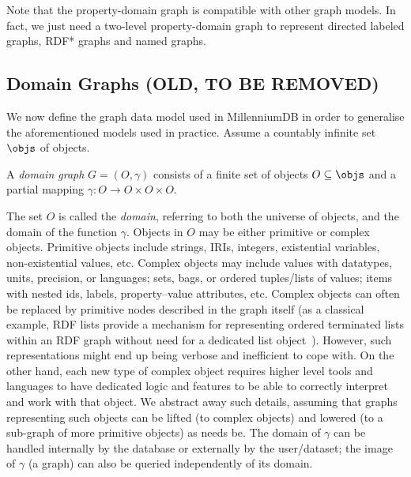 Note that the property-domain graph is compatible with other graph models.
In fact, we just need a two-level property-domain graph to represent directed labeled graphs, RDF* graphs and named graphs.








\subsection{Domain Graphs (OLD, TO BE REMOVED)}
\label{sec-proposal}

We now define the graph data model used in MillenniumDB in order to generalise the aforementioned models used in practice. Assume a countably infinite set $\objs$ of objects.

\begin{definition}
A \emph{domain graph} $G = (O,\gamma)$ consists of a finite set of objects $O\subseteq \objs$ and a partial mapping $\gamma : O \rightarrow O \times O \times O$.
\end{definition}

The set $O$ is called the \textit{domain}, referring to both the universe of objects, and the domain of the function $\gamma$. Objects in $O$ may be either primitive or complex objects. Primitive objects include strings, IRIs, integers, existential variables, non-existential values, etc. Complex objects may include values with datatypes, units, precision, or languages; sets, bags, or ordered tuples/lists of values; items with nested ids, labels, property--value attributes, etc. Complex objects can often be replaced by primitive nodes described in the graph itself (as a classical example, RDF lists provide a mechanism for representing ordered terminated lists within an RDF graph without need for a dedicated list object~\cite{CyganiakWL14}). However, such representations might end up being verbose and inefficient to cope with. On the other hand, each new type of complex object requires higher level tools and languages to have dedicated logic and features to be able to correctly interpret and work with that object. We abstract away such details, assuming that graphs representing such objects can be lifted (to complex objects) and lowered (to a sub-graph of more primitive objects) as needs be. The domain of $\gamma$ can be handled internally by the database or externally by the user/dataset; the image of $\gamma$ (a graph) can also be queried independently of its domain.

